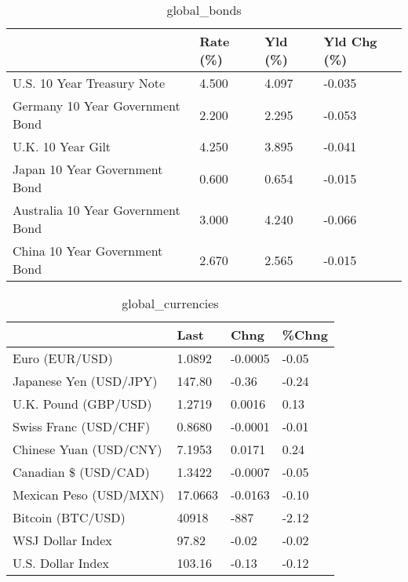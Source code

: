 \documentclass{article}%
\begin{document}
%


\begin{table}[htbp]%
\caption{global\_bonds}%
\centering%
\begin{adjustbox}{width=1\textwidth}%
\begin{tabular}{llll}
\toprule
                                  & Rate (\%) & Yld (\%) & Yld Chg (\%) \\
\midrule
       U.S. 10 Year Treasury Note &    4.500 &   4.097 &      -0.035 \\
  Germany 10 Year Government Bond &    2.200 &   2.295 &      -0.053 \\
                U.K. 10 Year Gilt &    4.250 &   3.895 &      -0.041 \\
    Japan 10 Year Government Bond &    0.600 &   0.654 &      -0.015 \\
Australia 10 Year Government Bond &    3.000 &   4.240 &      -0.066 \\
    China 10 Year Government Bond &    2.670 &   2.565 &      -0.015 \\
\bottomrule
\end{tabular}
%
\end{adjustbox}%
\end{table}

%


\begin{table}[htbp]%
\caption{global\_currencies}%
\centering%
\begin{adjustbox}{width=1\textwidth}%
\begin{tabular}{llll}
\toprule
                       &    Last &    Chng & \%Chng \\
\midrule
        Euro (EUR/USD) &  1.0892 & -0.0005 & -0.05 \\
Japanese Yen (USD/JPY) &  147.80 &   -0.36 & -0.24 \\
  U.K. Pound (GBP/USD) &  1.2719 &  0.0016 &  0.13 \\
 Swiss Franc (USD/CHF) &  0.8680 & -0.0001 & -0.01 \\
Chinese Yuan (USD/CNY) &  7.1953 &  0.0171 &  0.24 \\
  Canadian \$ (USD/CAD) &  1.3422 & -0.0007 & -0.05 \\
Mexican Peso (USD/MXN) & 17.0663 & -0.0163 & -0.10 \\
     Bitcoin (BTC/USD) &   40918 &    -887 & -2.12 \\
      WSJ Dollar Index &   97.82 &   -0.02 & -0.02 \\
     U.S. Dollar Index &  103.16 &   -0.13 & -0.12 \\
\bottomrule
\end{tabular}
%
\end{adjustbox}%
\end{table}
\end{document}
